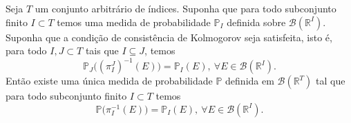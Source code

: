 \begin{teorema}
\label{teo-exist-kolmogorov-nao-enumeravel}
Seja $T$ um conjunto arbitrário de índices. 
Suponha que para todo subconjunto finito $I\subset T$
temos uma medida de probabilidade $\mathbb{P}_{I}$
definida sobre $\mathscr{B}(\mathbb{R}^I)$.
Suponha que a condição de consistência de Kolmogorov 
seja satisfeita, isto é, para todo $I,J\subset T$ 
tais que $I\subseteq J$, temos
\[
\mathbb{P}_{J}\big( (\pi^{J}_{I})^{-1}(E) \big)
=
\mathbb{P}_{I}(E),
\ \forall E\in\mathscr{B}(\mathbb{R}^{I}).
\]
Então existe uma única medida de probabilidade 
$\mathbb{P}$ definida em $\mathscr{B}(\mathbb{R}^T)$ 
tal que para todo subconjunto finito $I\subset T$ temos
\[
\mathbb{P}\big(\pi^{-1}_{I}(E) ) = \mathbb{P}_{I}(E),
\ \forall E\in\mathscr{B}(\mathbb{R}^{I}).
\]
\end{teorema}


